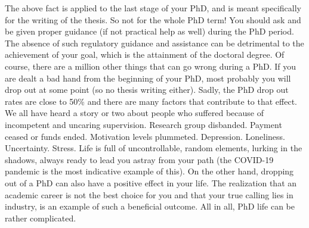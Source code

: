 \documentclass[
  12pt,
]{book}
\begin{document}
The above fact is applied to the last stage of your PhD, and is meant specifically for the writing of the thesis.
So not for the whole PhD term! You should ask and be given proper guidance (if not practical help as well) during the PhD period.
The absence of such regulatory guidance and assistance can be detrimental to the achievement of your goal, which is the attainment of the doctoral degree.
Of course, there are a million other things that can go wrong during a PhD.
If you are dealt a bad hand from the beginning of your PhD, most probably you will drop out at some point (so no thesis writing either).
Sadly, the PhD drop out rates are close to 50\% and there are many factors that contribute to that effect.
We all have heard a story or two about people who suffered because of incompetent and uncaring supervision.
Research group disbanded.
Payment ceased or funds ended.
Motivation levels plummeted.
Depression.
Loneliness.
Uncertainty.
Stress.
Life is full of uncontrollable, random elements, lurking in the shadows, always ready to lead you astray from your path (the COVID-19 pandemic is the most indicative example of this).
On the other hand, dropping out of a PhD can also have a positive effect in your life.
The realization that an academic career is not the best choice for you and that your true calling lies in industry, is an example of such a beneficial outcome.
All in all, PhD life can be rather complicated.
\end{document}
